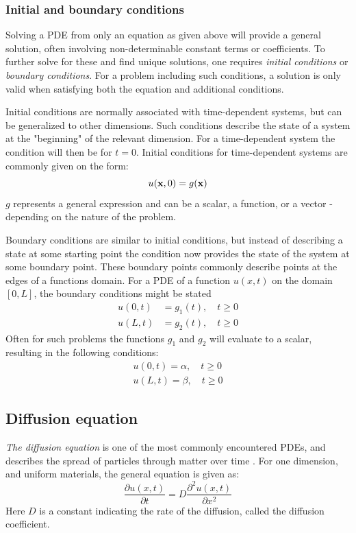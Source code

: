 \subsubsection{Initial and boundary conditions}
Solving a PDE from only an equation as given above will provide a general solution, often involving non-determinable constant terms or coefficients. To further solve for these and find unique solutions, one requires \textit{initial conditions} or \textit{boundary conditions}. For a problem including such conditions, a solution is only valid when satisfying both the equation and additional conditions. 

Initial conditions are normally associated with time-dependent systems, but can be generalized to other dimensions. Such conditions describe the state of a system at the "beginning" of the relevant dimension. For a time-dependent system the condition will then be for $t=0$. Initial conditions for time-dependent systems are commonly given on the form: 
\begin{equation}
    u(\bold{x}, 0) = g(\bold{x})
\end{equation}
$g$ represents a general expression and can be a scalar, a function, or a vector - depending on the nature of the problem. 

Boundary conditions are similar to initial conditions, but instead of describing a state at some starting point the condition now provides the state of the system at some boundary point. These boundary points commonly describe points at the edges of a functions domain. For a PDE of a function $u(x,t)$ on the domain $[0, L]$, the boundary conditions might be stated
\begin{equation}
    \begin{split}
        u(0, t) &= g_1(t), \quad t\geq0 \\
        u(L, t) &= g_2(t), \quad t\geq0
    \end{split}
\end{equation}
Often for such problems the functions $g_1$ and $g_2$ will evaluate to a scalar, resulting in the following conditions: 
\begin{equation}
    \begin{split}
        u(0, t) = \alpha, \quad t\geq0 \\
        u(L, t) = \beta, \quad t\geq0
    \end{split}
\end{equation}

\subsection{Diffusion equation}
\textit{The diffusion equation} is one of the most commonly encountered PDEs, and describes the spread of particles through matter over time \citep[p. 18]{tveitoPDE}. For one dimension, and uniform materials, the general equation is given as:
\begin{equation}
    \frac{\partial u(x,t)}{\partial t} = D \frac{\partial^2 u(x,t)}{\partial x^2}
\end{equation}
Here $D$ is a constant indicating the rate of the diffusion, called the diffusion coefficient. 


